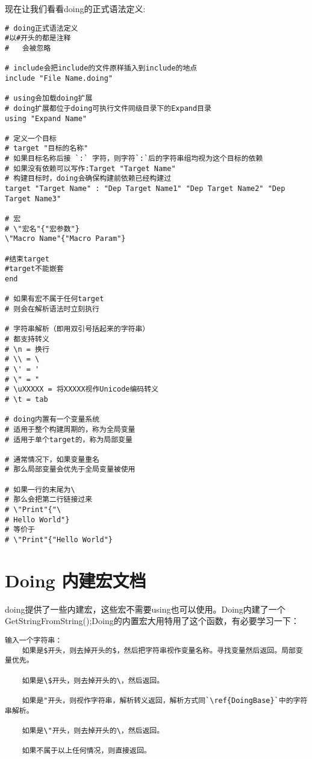 现在让我们看看doing的正式语法定义:
\label{DoingBase}
\begin{lstlisting}
# doing正式语法定义
#以#开头的都是注释
#	会被忽略

# include会把include的文件原样插入到include的地点
include "File Name.doing"

# using会加载doing扩展
# doing扩展都位于doing可执行文件同级目录下的Expand目录
using "Expand Name"

# 定义一个目标
# target "目标的名称"
# 如果目标名称后接 `:` 字符，则字符`:`后的字符串组均视为这个目标的依赖
# 如果没有依赖可以写作:Target "Target Name"
# 构建目标时，doing会确保构建前依赖已经构建过
target "Target Name" : "Dep Target Name1" "Dep Target Name2" "Dep Target Name3"

# 宏
# \"宏名"{"宏参数"}
\"Macro Name"{"Macro Param"}

#结束target
#target不能嵌套
end

# 如果有宏不属于任何target
# 则会在解析语法时立刻执行

# 字符串解析（即用双引号括起来的字符串） 
# 都支持转义
# \n = 换行
# \\ = \
# \' = '
# \" = "
# \uXXXXX = 将XXXXX视作Unicode编码转义
# \t = tab

# doing内置有一个变量系统
# 适用于整个构建周期的，称为全局变量
# 适用于单个target的，称为局部变量

# 通常情况下，如果变量重名
# 那么局部变量会优先于全局变量被使用

# 如果一行的末尾为\
# 那么会把第二行链接过来
# \"Print"{"\
# Hello World"}
# 等价于
# \"Print"{"Hello World"}
\end{lstlisting}


\chapter{Doing 内建宏文档}
doing提供了一些内建宏，这些宏不需要using也可以使用。Doing内建了一个GetStringFromString();Doing的内置宏大用特用了这个函数，有必要学习一下：\newline{}
\label{GetStringFromStrin}
\begin{lstlisting}
输入一个字符串：
	如果是$开头，则去掉开头的$，然后把字符串视作变量名称。寻找变量然后返回。局部变量优先。
	
	如果是\$开头，则去掉开头的\，然后返回。
	
	如果是"开头，则视作字符串，解析转义返回，解析方式同`\ref{DoingBase}`中的字符串解析。
	
	如果是\"开头，则去掉开头的\，然后返回。
	
	如果不属于以上任何情况，则直接返回。
\end{lstlisting}


